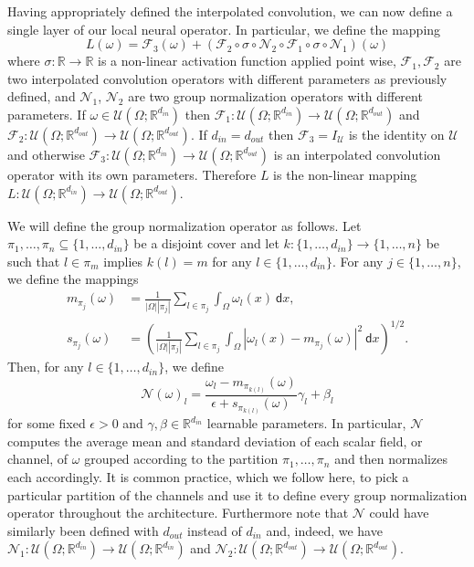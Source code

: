 \documentclass[preprint,11pt]{elsarticle}
\theoremstyle{plain}
\newcommand{\R}{\mathbb{R}}
\begin{document}
Having appropriately defined the interpolated convolution, we can now define a single layer of our local neural operator.
In particular, we define the mapping
\begin{equation}
    \label{eq:one_layer}
    L(\omega) = \mathcal{F}_3(\omega) + (\mathcal{F}_2 \circ \sigma \circ \mathcal{N}_2 \circ \mathcal{F}_1 \circ \sigma \circ \mathcal{N}_1)(\omega)
\end{equation}
where $\sigma : \R \to \R$ is a non-linear activation function applied point wise, $\mathcal{F}_1, \mathcal{F}_2$ are two interpolated convolution operators with different parameters as previously defined, and $\mathcal{N}_1$, $\mathcal{N}_2$ are two group normalization operators with different parameters. If $\omega \in \mathcal{U}(\Omega;\R^{d_{in}})$ then $\mathcal{F}_1 : \mathcal{U}(\Omega;\R^{d_{in}}) \to \mathcal{U}(\Omega;\R^{d_{out}})$ and $\mathcal{F}_2 : \mathcal{U}(\Omega;\R^{d_{out}}) \to \mathcal{U}(\Omega;\R^{d_{out}})$. If $d_{in} = d_{out}$ then $\mathcal{F}_3 = I_{\mathcal{U}}$ is the identity on $\mathcal{U}$ and otherwise $\mathcal{F}_3 : \mathcal{U}(\Omega;\R^{d_{in}}) \to \mathcal{U}(\Omega;\R^{d_{out}})$ is an interpolated convolution operator with its own parameters. Therefore $L$ is the non-linear mapping $L: \mathcal{U}(\Omega;\R^{d_{in}}) \to \mathcal{U}(\Omega;\R^{d_{out}})$.

We will define the group normalization operator as follows. Let $\pi_1,\dots,\pi_n \subseteq \{1,\dots,d_{in}\}$ be a disjoint cover and let $k : \{1,\dots,d_{in}\} \to \{1,\dots,n\} $ be such that $l \in \pi_m$ implies $k(l) = m$ for any $l \in \{1,\dots,d_{in}\}$. For any $j \in \{1,\dots,n\}$, we define the mappings
\begin{align}
    m_{\pi_j}(\omega) &= \frac{1}{|\Omega| |\pi_j|} \sum_{l \in \pi_j} \int_{\Omega} \omega_l (x)\: \mathsf{d}x, \\
    s_{\pi_j}(\omega) &= \left ( \frac{1}{|\Omega| |\pi_j|} \sum_{l \in \pi_j} \int_{\Omega} |\omega_l (x) - m_{\pi_j}(\omega)|^2\: \mathsf{d}x \right )^{1/2} .
\end{align}
Then, for any $l \in \{1,\dots,d_{in}\}$, we define 
\begin{equation}
    \mathcal{N}(\omega)_l = \frac{\omega_l - m_{\pi_{k(l)}}(\omega)}{\epsilon + s_{\pi_{k(l)}}(\omega)} \gamma_l + \beta_l
\end{equation}
for some fixed $\epsilon > 0$ and $\gamma, \beta \in \R^{d_{in}}$ learnable parameters.
In particular, $\mathcal{N}$ computes the average mean and standard deviation of each scalar field, or channel, of $\omega$ grouped according to the partition $\pi_1,\dots,\pi_n$  and then normalizes each accordingly. It is common practice, which we follow here, to pick a particular partition of the channels and use it to define every group normalization operator throughout the architecture. Furthermore note that $\mathcal{N}$ could have similarly been defined with $d_{out}$ instead of $d_{in}$ and, indeed, we have $\mathcal{N}_1 : \mathcal{U}(\Omega;\R^{d_{in}}) \to \mathcal{U}(\Omega;\R^{d_{in}})$ and $\mathcal{N}_2 : \mathcal{U}(\Omega;\R^{d_{out}}) \to \mathcal{U}(\Omega;\R^{d_{out}})$.
\end{document}
